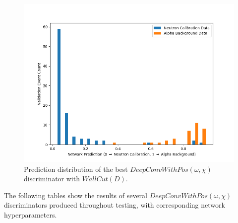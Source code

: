 \documentclass[10pt]{article}
\begin{document}
\begin{figure}[H]
    \centering
    \includegraphics[width=\textwidth]{waveform_wall_cut_hist}
    \caption{\label{waveform_wall_cut_hist} Prediction distribution of the best $DeepConvWithPos(\omega, \chi)$ discriminator with $WallCut(D)$.}
\end{figure}

The following tables show the results of several $DeepConvWithPos(\omega, \chi)$ discriminators produced throughout testing, with corresponding network hyperparameters.
\end{document}
